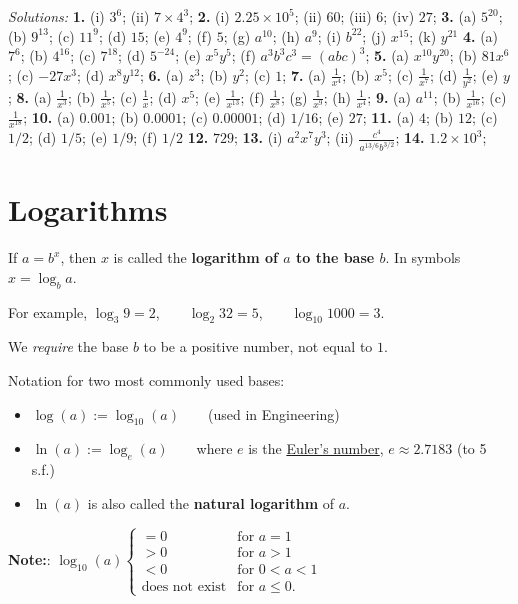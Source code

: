 \documentclass[
  english,
  12pt,
  oneside]{book}
\providecommand{\tightlist}{%
  \setlength{\itemsep}{0pt}\setlength{\parskip}{0pt}}
\theoremstyle{definition}
\theoremstyle{definition}
\theoremstyle{definition}
\theoremstyle{definition}
\theoremstyle{remark}
\begin{document}
\emph{Solutions:}
\textbf{1.} (i) \(3^6\); (ii) \(7\times 4^3\);
\textbf{2.} (i) \(2.25\times 10^5\); (ii) \(60\); (iii) \(6\); (iv) \(27\);
\textbf{3.} (a) \(5^{20}\); (b) \(9^{13}\); (c) \(11^9\); (d) \(15\); (e) \(4^9\); (f) \(5\); (g) \(a^{10}\); (h) \(a^9\); (i) \(b^{22}\); (j) \(x^{15}\); (k) \(y^{21}\)
\textbf{4.} (a) \(7^6\); (b) \(4^{16}\); (c) \(7^{18}\); (d) \(5^{-24}\); (e) \(x^5y^5\); (f) \(a^3b^3c^3=(abc)^3\);
\textbf{5.} (a) \(x^{10}y^{20}\); (b) \(81x^6\); (c) \(-27x^3\); (d) \(x^8y^{12}\);
\textbf{6.} (a) \(z^3\); (b) \(y^2\); (c) \(1\);
\textbf{7.} (a) \(\frac{1}{x^4}\); (b) \(x^5\); (c) \(\frac{1}{x^7}\); (d) \(\frac{1}{y^2}\); (e) \(y\);
\textbf{8.} (a) \(\frac{1}{x^3}\); (b) \(\frac{1}{x^5}\); (c) \(\frac{1}{x}\); (d) \(x^5\); (e) \(\frac{1}{x^{13}}\); (f) \(\frac{1}{x^8}\); (g) \(\frac{1}{x^9}\); (h) \(\frac{1}{x^4}\);
\textbf{9.} (a) \(a^{11}\); (b) \(\frac{1}{x^{16}}\); (c) \(\frac{1}{x^{18}}\);
\textbf{10.} (a) \(0.001\); (b) \(0.0001\); (c) \(0.00001\); (d) \(1/16\); (e) \(27\);
\textbf{11.} (a) \(4\); (b) \(12\); (c) \(1/2\); (d) \(1/5\); (e) \(1/9\); (f) \(1/2\)
\textbf{12.} \(729\);
\textbf{13.} (i) \(a^2x^7y^3\); (ii) \(\frac{c^4}{a^{13/6}b^{3/2}}\);
\textbf{14.} \(1.2\times 10^3\);

\chapter{Logarithms}\label{logarithms}

If \(a=b^x\), then \(x\) is called the \textbf{logarithm of \(a\) to the base \(b\)}. In symbols \(x=\log_b a\).

For example, \(\log_3 9=2\), ~ ~ \(\log_2 32=5\), ~ ~ \(\log_{10} 1000=3\).

We \emph{require} the base \(b\) to be a positive number, not equal to \(1\).

Notation for two most commonly used bases:

\begin{itemize}
\tightlist
\item
  \(\log(a) := \log_{10}(a)\) ~ ~ (used in Engineering)
\item
  \(\ln(a) := \log_e(a)\) ~ ~ where \(e\) is the \href{https://en.wikipedia.org/wiki/E_(mathematical_constant)}{Euler's number}, \(e \approx 2.7183\) (to 5 s.f.)
\item
  \(\ln(a)\) is also called the \textbf{natural logarithm} of \(a\).
\end{itemize}

\textbf{Note:}: \(\log_{10}(a) \begin{cases} =0 & \text{for }a=1\\ >0& \text{for }a>1\\ <0 &\text{for }0<a<1\\\text{does not exist}&\text{for }a\leq0.\end{cases}\)
\end{document}
